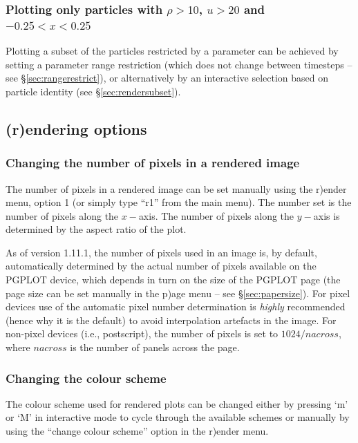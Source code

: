 \documentclass[a4paper,10pt]{article}
\begin{document}
\subsubsection{ Plotting only particles with $\rho > 10$, $u > 20$ and $-0.25 < x < 0.25$}
 Plotting a subset of the particles restricted by a parameter can be achieved by setting a parameter range restriction (which does not change between timesteps -- see \S\ref{sec:rangerestrict}), or alternatively by an interactive selection based on particle identity (see \S\ref{sec:rendersubset}).


\subsection{(r)endering options}%
\subsubsection{ Changing the number of pixels in a rendered image}
 The number of pixels in a rendered image can be set manually using the r)ender menu, option 1 (or simply type ``r1'' from the main menu). The number set is the number of pixels along the $x-$axis. The number of pixels along the $y-$axis is determined by the aspect ratio of the plot.

 As of version 1.11.1, the number of pixels used in an image is, by default, automatically determined by the actual number of pixels available on the PGPLOT device, which depends in turn on the size of the PGPLOT page (the page size can be set manually in the p)age menu -- see \S\ref{sec:papersize}). For pixel devices use of the automatic pixel number determination is \emph{highly} recommended (hence why it is the default) to avoid interpolation artefacts in the image. For non-pixel devices (i.e., postscript), the number of pixels is set to $1024/nacross$, where $nacross$ is the number of panels across the page. 

\subsubsection{ Changing the colour scheme}
 The colour scheme used for rendered plots can be changed either by pressing `m' or `M' in interactive mode to cycle through the available schemes or manually by using the ``change colour scheme'' option in the r)ender menu.
\end{document}

